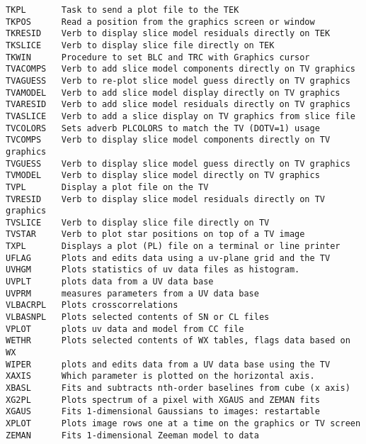 \begin{verbatim}
TKPL       Task to send a plot file to the TEK
TKPOS      Read a position from the graphics screen or window
TKRESID    Verb to display slice model residuals directly on TEK
TKSLICE    Verb to display slice file directly on TEK
TKWIN      Procedure to set BLC and TRC with Graphics cursor
TVACOMPS   Verb to add slice model components directly on TV graphics
TVAGUESS   Verb to re-plot slice model guess directly on TV graphics
TVAMODEL   Verb to add slice model display directly on TV graphics
TVARESID   Verb to add slice model residuals directly on TV graphics
TVASLICE   Verb to add a slice display on TV graphics from slice file
TVCOLORS   Sets adverb PLCOLORS to match the TV (DOTV=1) usage
TVCOMPS    Verb to display slice model components directly on TV graphics
TVGUESS    Verb to display slice model guess directly on TV graphics
TVMODEL    Verb to display slice model directly on TV graphics
TVPL       Display a plot file on the TV
TVRESID    Verb to display slice model residuals directly on TV graphics
TVSLICE    Verb to display slice file directly on TV
TVSTAR     Verb to plot star positions on top of a TV image
TXPL       Displays a plot (PL) file on a terminal or line printer
UFLAG      Plots and edits data using a uv-plane grid and the TV
UVHGM      Plots statistics of uv data files as histogram.
UVPLT      plots data from a UV data base
UVPRM      measures parameters from a UV data base
VLBACRPL   Plots crosscorrelations
VLBASNPL   Plots selected contents of SN or CL files
VPLOT      plots uv data and model from CC file
WETHR      Plots selected contents of WX tables, flags data based on WX
WIPER      plots and edits data from a UV data base using the TV
XAXIS      Which parameter is plotted on the horizontal axis.
XBASL      Fits and subtracts nth-order baselines from cube (x axis)
XG2PL      Plots spectrum of a pixel with XGAUS and ZEMAN fits
XGAUS      Fits 1-dimensional Gaussians to images: restartable
XPLOT      Plots image rows one at a time on the graphics or TV screen
ZEMAN      Fits 1-dimensional Zeeman model to data
\end{verbatim}\eve


